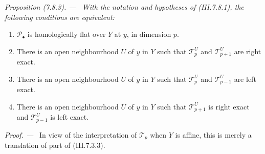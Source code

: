 \documentclass[10pt,oneside]{book}
\newcommand{\sh}[1]{\mathscr{#1}}
\newcommand{\sref}[2][]{(#2)}
\newenvironment{proposition}[1][]{\par\medskip\noindent\itshape Proposition (#1). ---\ }{\par}
\newenvironment{proof}{\par\medskip\noindent\textit{Proof. ---\ }}{\par}
\begin{document}
\begin{proposition}[7.8.3]
\label{III.7.8.3}
With the notation and hypotheses of \sref{III.7.8.1}, the
following conditions are equivalent:
\begin{enumerate}
  \item[a)] $\sh{P}_\bullet$ is homologically flat over $Y$
  at $y$, in dimension $p$.
  \item[b)] There is an open neighbourhood $U$ of $y$ in
  $Y$ such that $\sh{T}_p^U$ and $\sh{T}_{p+1}^U$ are right
  exact.
  \item[c)] There is an open neighbourhood $U$ of $y$ in
  $Y$ such that $\sh{T}_p^U$ and $\sh{T}_{p-1}^U$ are left
  exact.
  \item[d)] There is an open neighbourhood $U$ of $y$ in
  $Y$ such that $\sh{T}_{p+1}^U$ is right exact and
  $\sh{T}_{p-1}^U$ is left exact.
\end{enumerate}
\end{proposition}

\begin{proof}
In view of the interpretation of $\sh{T}_p$ when $Y$ is
affine, this is merely a translation of part of
\sref{III.7.3.3}.
\end{proof}
\end{document}
